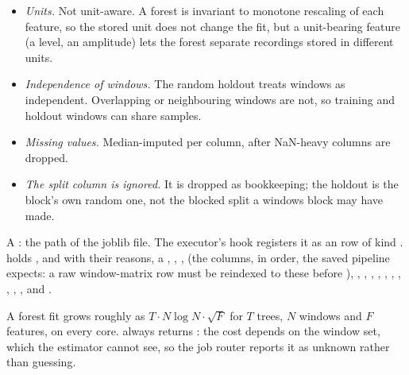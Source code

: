\begin{itemize}
\item \emph{Units.} Not unit-aware. A forest is invariant to monotone rescaling of each
  feature, so the stored unit does not change the fit, but a unit-bearing feature (a level,
  an amplitude) lets the forest separate recordings stored in different units.
\item \emph{Independence of windows.} The random holdout treats windows as independent.
  Overlapping or neighbouring windows are not, so training and holdout windows can share
  samples.
\item \emph{Missing values.} Median-imputed per column, after NaN-heavy columns are dropped.
\item \emph{The split column is ignored.} It is dropped as bookkeeping; the holdout is the
  block's own random one, not the blocked split a windows block may have made.
\end{itemize}

A : the path of the joblib file. The executor's  hook registers it
as an  row of kind .  holds ,
 and  with their reasons, a ,
, ,  (the columns, in order, the saved
pipeline expects: a raw window-matrix row must be reindexed to these before
), , , ,
, , ,
, , ,
,  and .

A forest fit grows roughly as $T \cdot N \log N \cdot \sqrt{F}$ for $T$ trees, $N$ windows and
$F$ features, on every core.  always returns : the cost depends on
the window set, which the estimator cannot see, so the job router reports it as unknown
rather than guessing.

